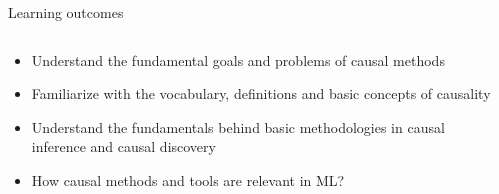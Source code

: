 \documentclass{beamer}
\begin{document}
\begin{frame}{Learning outcomes} 

  \begin{columns}
    \begin{column}{0.5\textwidth}
  \begin{itemize}[<+-|alert@+>]
    \item Understand the fundamental
          goals and problems of causal methods  
    \item Familiarize with the vocabulary, definitions and basic concepts of causality
    \item Understand the fundamentals behind basic methodologies in
          causal inference and causal discovery
	\item How causal methods and tools are relevant in ML?
  \end{itemize}
    \end{column}
    \begin{column}{0.5\textwidth}
\end{column}
\end{columns}
\end{frame}
\end{document}
